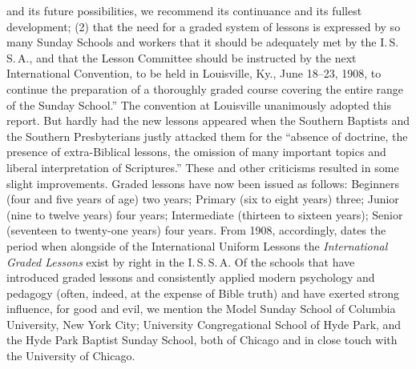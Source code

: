 and its future possibilities, we recommend its continuance and its fullest development; (2) that the need for a graded system of lessons is expressed by so many Sunday Schools and workers that it should be adequately met by the I.\,S.\,S.\,A., and that the Lesson Committee should be instructed by the next International Convention, to be held in Louisville, Ky., June 18–23, 1908, to continue the preparation of a thoroughly graded course covering the entire range of the Sunday School.” The convention at Louisville unanimously adopted this report. But hardly had the new lessons appeared when the Southern Baptists and the Southern Presbyterians justly attacked them for the “absence of doctrine, the presence of extra-Biblical lessons, the omission of many important topics and liberal interpretation of Scriptures.” These and other criticisms resulted in some slight improvements. Graded lessons have now been issued as follows: Beginners (four and five years of age) two years; Primary (six to eight years) three; Junior (nine to twelve years) four years; Intermediate (thirteen to sixteen years); Senior (seventeen to twenty-one years) four years. From 1908, accordingly, dates the period when alongside of the International Uniform Lessons the \emph{International Graded Lessons} exist by right in the I.\,S.\,S.\,A. Of the schools that have introduced graded lessons and consistently applied modern psychology and pedagogy (often, indeed, at the expense of Bible truth) and have exerted strong influence, for good and evil, we mention the Model Sunday School of Columbia University, New York City; University Congregational School of Hyde Park, and the Hyde Park Baptist Sunday School, both of Chicago and in close touch with the University of Chicago.

\trenner

